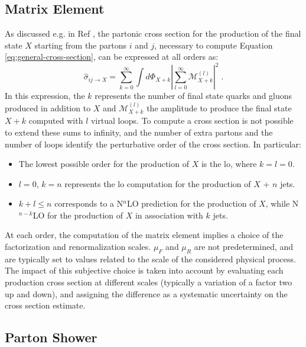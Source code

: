 \subsection{Matrix Element}

As discussed e.g. in Ref \cite{Skands:2011pf}, the partonic cross section for the production of the final state $X$ starting from the partons $i$ and $j$, necessary to compute
Equation \ref{eq:general-cross-section}, can be expressed at all orders as:
\begin{equation}
\hat\sigma_{ij\rightarrow X} = \sum_{k=0}^\infty \int d\Phi_{X+k} |\sum_{l=0}^\infty \mathcal{M}_{X+k}^{(l)}|^2 \; .
\label{eq:xsec_matrix}
\end{equation}
\noindent In this expression, the $k$ represents the number of final state quarks and gluons produced in addition to $X$ and $\mathcal{M}_{X+k}^{(l)}$
the amplitude to produce the final state $X+k$ computed with $l$ virtual loops. To compute a cross section is not possible to extend these sums to infinity, and the number of extra partons and the number of loops identify the 
perturbative order of the cross section. In particular:
\begin{itemize}
\item The lowest possible order for the production of $X$ is the \gls{lo}, where $k=l=0$.
\item $l=0$, $k=n$ represents the \gls{lo} computation for the production of $X$ + $n$ jets.
\item $k+l \leq n$ corresponds to a N$^n$LO prediction for the production of $X$, while N$^{n-k}$LO for the production of $X$ in association with $k$ jets.
\end{itemize}

At each order, the computation of the matrix element implies a choice of the factorization and renormalization scales.
$\mu_F$ and $\mu_R$ are not predetermined, and are typically set to values related to the scale of the considered physical process. 
The impact of this subjective choice is taken into account by evaluating each production cross section at different scales (typically a variation of a factor two up and down), and assigning the difference as a systematic uncertainty on the cross section estimate.


\subsection{Parton Shower}


